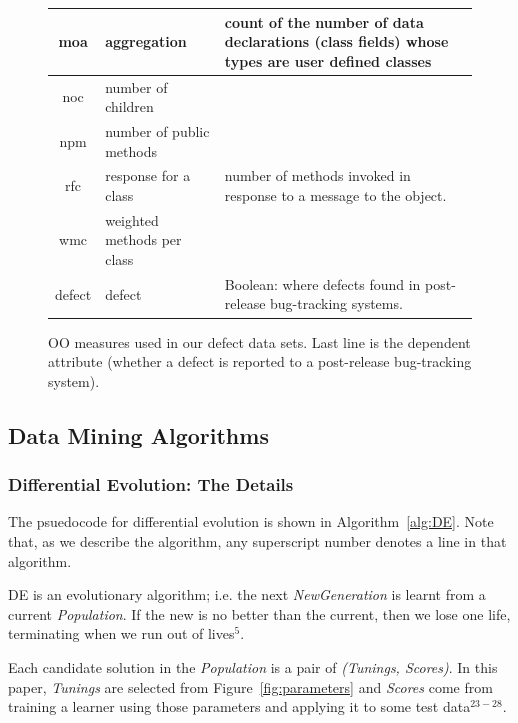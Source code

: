 \documentclass{sig-alternative}
\newcommand{\fig}[1]{Figure~\ref{fig:#1}}
\begin{document}
\begin{figure}[!t]
\begin{center}
{\begin{tabular}{c|l|p{4in}}
moa &  aggregation &  count of the number of data declarations (class
fields) whose types are user defined classes\\\hline
noc &  number of children &\\\hline
npm & number of public methods & \\\hline
rfc & response for a class &number of  methods invoked in response to
a message to the object.\\\hline
wmc & weighted methods per class &\\\hline
\rowcolor{lightgray}
defect & defect & Boolean: where defects found in post-release bug-tracking systems.
\end{tabular}
}
\end{center}
\caption{OO measures used in our defect data sets.  Last line is
the dependent attribute (whether a defect is reported to  a
post-release bug-tracking system).}\label{fig:ck}
\end{figure}




 

\subsection{Data Mining Algorithms}
 


\subsubsection{Differential Evolution: The Details}
 
 
The psuedocode for differential evolution is shown in Algorithm~\ref{alg:DE}.
Note that, as we describe the algorithm,
  any superscript number denotes a line in that algorithm.


DE is an evolutionary algorithm; i.e. the next {\em NewGeneration} is learnt from
a current {\em Population}.  If the new is no better than the current, then
we lose one life, terminating when we run out of lives$^5$.

Each candidate solution in the {\em Population}  
is a pair of {\em (Tunings, Scores)}. In this paper, {\em Tunings} are selected from
\fig{parameters} and {\em Scores} come from training a learner using those parameters
and applying it to some test data$^{23-28}$.
\end{document}
